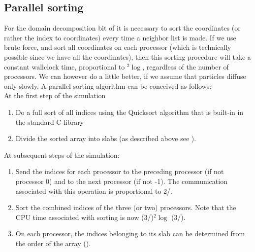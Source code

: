 \subsection{Parallel sorting}
\label{sec:parsort}
For the domain decomposition bit of {\gromacs} it is necessary to sort the 
coordinates (or rather the index to coordinates) every time a neighbor list is made.
If we use brute force, and sort all coordinates on each processor (which is 
technically possible since we have all the coordinates), then this sorting procedure
will take a constant wallclock time, proportional to {\natom}$^2\log${\natom}, 
regardless of the number of processors. We can however do a little
better, if we assume that particles diffuse only slowly.
A parallel sorting algorithm can be conceived as follows: \\
At the first step of the simulation
\begin{enumerate}
\item   Do a full sort of all indices using {\eg} the  Quicksort algorithm that is
        built-in in the standard C-library
\item   Divide the sorted array into slabs (as described above see 
        ).
\end{enumerate}
At subsequent steps of the simulation:
\begin{enumerate}
\item   Send the indices for each processor to the preceding processor (if
        not processor 0) and to the next processor (if not {\nproc}-1). The 
        communication associated with this operation is proportional to
        2{\natom}/{\nproc}.
\item   Sort the combined indices of the three (or two) processors. Note that
        the CPU time associated with sorting is now
        (3{\natom}/{\nproc})$^2\log$ (3{\natom}/{\nproc}).
\item   On each processor, the indices belonging to its slab can be determined
        from the order of the array ().
\end{enumerate}


